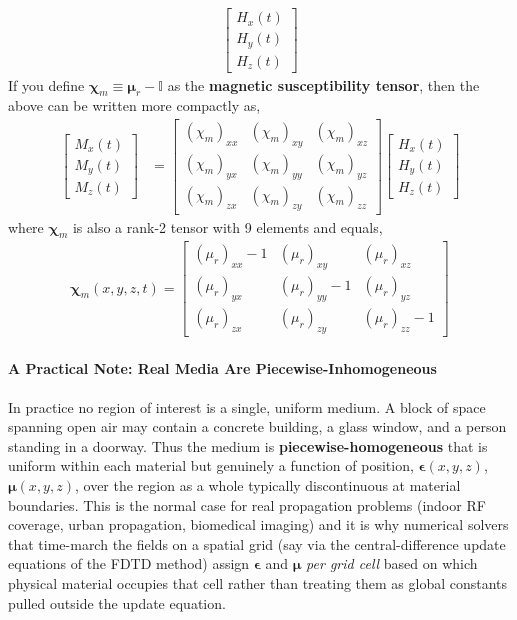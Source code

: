\begin{itemize}
\begin{align*}
\begin{bmatrix}
        H_x(t) \\
        H_y(t) \\
        H_z(t)
      \end{bmatrix}
    \end{align*}
    If you define \( \boldsymbol{\chi}_m \equiv \boldsymbol{\mu}_r - \mathbb{I} \) as the
    \textbf{magnetic susceptibility tensor}, then the above can be written more compactly
    as,
    \begin{align*}
      \begin{bmatrix}
        M_x(t) \\
        M_y(t) \\
        M_z(t)
      \end{bmatrix}
      &=
      \begin{bmatrix}
        (\chi_m)_{xx} & (\chi_m)_{xy} & (\chi_m)_{xz} \\
        (\chi_m)_{yx} & (\chi_m)_{yy} & (\chi_m)_{yz} \\
        (\chi_m)_{zx} & (\chi_m)_{zy} & (\chi_m)_{zz}
      \end{bmatrix}
      \begin{bmatrix}
        H_x(t) \\
        H_y(t) \\
        H_z(t)
      \end{bmatrix}
    \end{align*}
    where \( \boldsymbol{\chi}_m \) is also a rank-2 tensor with 9 elements and equals,
    \begin{align*}
      \boldsymbol{\chi}_m(x,y,z,t) = \begin{bmatrix}
        (\mu_r)_{xx} - 1 & (\mu_r)_{xy} & (\mu_r)_{xz} \\
        (\mu_r)_{yx} & (\mu_r)_{yy} - 1 & (\mu_r)_{yz} \\
        (\mu_r)_{zx} & (\mu_r)_{zy} & (\mu_r)_{zz} - 1
      \end{bmatrix}
    \end{align*}
\end{itemize}

\paragraph{A Practical Note: Real Media Are Piecewise-Inhomogeneous}
In practice no region of interest is a single, uniform medium. A block of
space spanning open air may contain a concrete building, a glass window,
and a person standing in a doorway. Thus the medium  is \textbf{piecewise-homogeneous}
that is uniform within each material but genuinely a function of position,
\( \boldsymbol{\epsilon}(x,y,z) \), \( \boldsymbol{\mu}(x,y,z) \), over the
region as a whole typically discontinuous at material boundaries. This is
the normal case for real propagation problems (indoor RF coverage, urban
propagation, biomedical imaging) and it is why numerical solvers that time-march
the fields on a spatial grid (say via the central-difference update
equations of the FDTD method) assign \( \boldsymbol{\epsilon} \) and
\( \boldsymbol{\mu} \) \emph{per grid cell} based on which physical material
occupies that cell rather than treating them as global constants pulled outside the
update equation.
